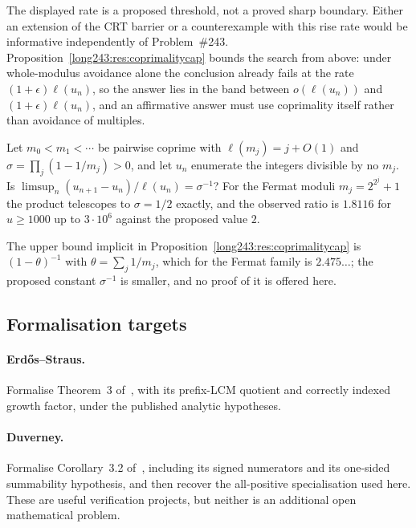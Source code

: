 \noindent The displayed rate is a proposed threshold, not a proved sharp
boundary.  Either an extension of the CRT barrier or a counterexample with
this rise rate would be informative independently of Problem~\#243.
Proposition~\ref{long243:res:coprimalitycap} bounds the search from above: under
whole-modulus avoidance alone the conclusion already fails at the rate
$(1+\epsilon)\ell(u_n)$, so the answer lies in the band between
$o(\ell(u_n))$ and $(1+\epsilon)\ell(u_n)$, and an affirmative answer must use
coprimality itself rather than avoidance of multiples.

\begin{problem}\label{long243:res:gapconstant}
Let $m_0<m_1<\cdots$ be pairwise coprime with $\ell(m_j)=j+O(1)$ and
$\sigma=\prod_j(1-1/m_j)>0$, and let $u_n$ enumerate the integers divisible by
no $m_j$.  Is $\limsup_n(u_{n+1}-u_n)/\ell(u_n)=\sigma^{-1}$?  For the Fermat
moduli $m_j=2^{2^j}+1$ the product telescopes to $\sigma=1/2$ exactly, and the
observed ratio is $1.8116$ for $u\ge1000$ up to $3\cdot10^6$ against the
proposed value $2$.
\end{problem}

\noindent The upper bound implicit in Proposition~\ref{long243:res:coprimalitycap} is
$(1-\theta)^{-1}$ with $\theta=\sum_j1/m_j$, which for the Fermat family is
$2.475\ldots$; the proposed constant $\sigma^{-1}$ is smaller, and no proof of
it is offered here.

\subsection*{Formalisation targets}

\paragraph{Erd\H{o}s--Straus.}
Formalise Theorem~3 of~\cite{erdosstraus1964}, with its prefix-LCM quotient
and correctly indexed growth factor, under the published analytic hypotheses.

\paragraph{Duverney.}
Formalise Corollary~3.2 of~\cite{duverney2001}, including its signed
numerators and its one-sided summability hypothesis, and then recover the
all-positive specialisation used here.  These are useful verification
projects, but neither is an additional open mathematical problem.

